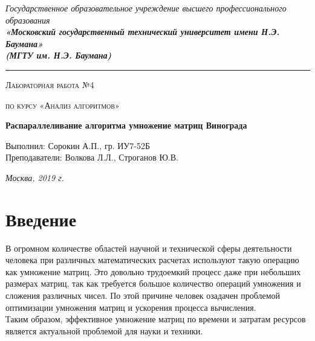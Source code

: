 \documentclass[12pt, a4paper]{report}
\begin{document}
    \begin{titlepage}

        \begin{center}
            \Large
            {\sl Государственное образовательное учреждение высшего профессионального образования\\
            {\bf«Московский государственный технический университет имени Н.Э. Баумана»\\
				(МГТУ им. Н.Э. Баумана)}}
				\noindent\rule{\textwidth}{2pt}
            \vspace{3cm}

			{\scshape\LARGE Лабораторная работа №4 \par}
			\vspace{0.5cm}	
			{\scshape\LARGE по курсу «Анализ алгоритмов» \par}
			\vspace{1.5cm}
			{\huge\bfseries Распараллеливание алгоритма умножение матриц Винограда \par}
			\vspace{2cm}
			\Large Выполнил: Сорокин А.П., гр. ИУ7-52Б\\
			\vspace{0.5cm}
			{\Large Преподаватели: Волкова Л.Л., Строганов Ю.В.}
		
			\vfill
			\Large \textit {Москва, 2019 г.}
            
        \end{center}

    \end{titlepage}
	
	\tableofcontents

	\chapter*{Введение}
	
	\hspace{1cm}В огромном количестве областей научной и технической сферы деятельности человека при различных математических расчетах используют такую операцию как умножение матриц. Это довольно трудоемкий процесс даже при небольших размерах матриц, так как требуется большое количество операций умножения и сложения различных чисел. По этой причине человек озадачен проблемой оптимизации умножения матриц и ускорения процесса вычисления.\\
	Таким образом, эффективное умножение матриц по времени и затратам ресурсов является актуальной проблемой для науки и техники.
\end{document}
